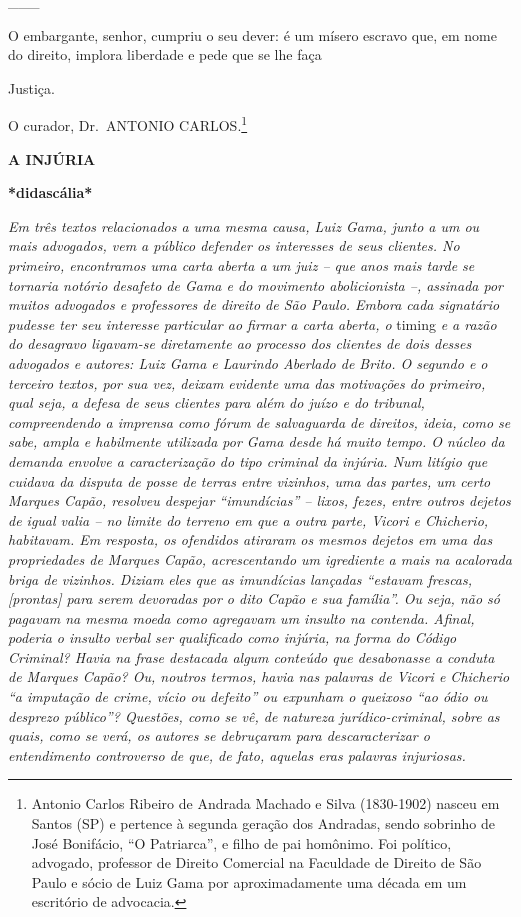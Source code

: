 \_\_\_

O embargante, senhor, cumpriu o seu dever: é um mísero escravo que, em
nome do direito, implora liberdade e pede que se lhe faça

Justiça.

O curador, Dr.~ANTONIO CARLOS.\footnote{Antonio Carlos Ribeiro de
  Andrada Machado e Silva (1830-1902) nasceu em Santos (SP) e pertence à
  segunda geração dos Andradas, sendo sobrinho de José Bonifácio, ``O
  Patriarca'', e filho de pai homônimo. Foi político, advogado,
  professor de Direito Comercial na Faculdade de Direito de São Paulo e
  sócio de Luiz Gama por aproximadamente uma década em um escritório de
  advocacia.}

\textbf{A INJÚRIA}

\textbf{*didascália*}

\emph{Em três textos relacionados a uma mesma causa, Luiz Gama, junto a
um ou mais advogados, vem a público defender os interesses de seus
clientes. No primeiro, encontramos uma carta aberta a um juiz -- que
anos mais tarde se tornaria notório desafeto de Gama e do movimento
abolicionista --, assinada por muitos advogados e professores de direito
de São Paulo. Embora cada signatário pudesse ter seu interesse
particular ao firmar a carta aberta, o} timing \emph{e a razão do
desagravo ligavam-se diretamente ao processo dos clientes de dois desses
advogados e autores: Luiz Gama e Laurindo Aberlado de Brito. O segundo e
o terceiro textos, por sua vez, deixam evidente uma das motivações do
primeiro, qual seja, a defesa de seus clientes para além do juízo e do
tribunal, compreendendo a imprensa como fórum de salvaguarda de
direitos, ideia, como se sabe, ampla e habilmente utilizada por Gama
desde há muito tempo. O núcleo da demanda envolve a caracterização do
tipo criminal da injúria. Num litígio que cuidava da disputa de posse de
terras entre vizinhos, uma das partes, um certo Marques Capão, resolveu
despejar ``imundícias'' -- lixos, fezes, entre outros dejetos de igual
valia -- no limite do terreno em que a outra parte, Vicori e Chicherio,
habitavam. Em resposta, os ofendidos atiraram os mesmos dejetos em uma
das propriedades de Marques Capão, acrescentando um igrediente a mais na
acalorada briga de vizinhos. Diziam eles que as imundícias lançadas
``estavam frescas, {[}prontas{]} para serem devoradas por o dito Capão e
sua família''. Ou seja, não só pagavam na mesma moeda como agregavam um
insulto na contenda. Afinal, poderia o insulto verbal ser qualificado
como injúria, na forma do Código Criminal? Havia na frase destacada
algum conteúdo que desabonasse a conduta de Marques Capão? Ou, noutros
termos, havia nas palavras de Vicori e Chicherio ``a imputação de crime,
vício ou defeito'' ou expunham o queixoso ``ao ódio ou desprezo
público''? Questões, como se vê, de natureza jurídico-criminal, sobre as
quais, como se verá, os autores se debruçaram para descaracterizar o
entendimento controverso de que, de fato, aquelas eras palavras
injuriosas.}

